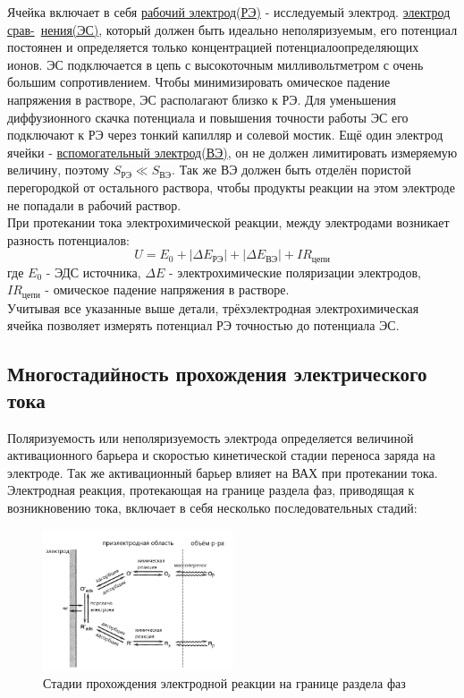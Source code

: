 \documentclass[a4paper,12pt]{article}
\begin{document}
Ячейка включает в себя \underline{рабочий электрод(РЭ)} - исследуемый электрод. \underline{электрод срав-}\
\underline{нения(ЭС)}, который должен быть идеально неполяризуемым, его потенциал постоянен и определяется только концентрацией потенциалоопределяющих ионов. ЭС подключается в цепь с высокоточным милливольтметром с очень большим сопротивлением. Чтобы минимизировать омическое падение напряжения в растворе, ЭС располагают близко к РЭ. Для уменьшения диффузионного скачка потенциала и повышения точности работы ЭС его подключают к РЭ через тонкий капилляр и солевой мостик. Ещё один электрод ячейки - \underline{вспомогательный электрод(ВЭ)}, он не должен лимитировать измеряемую величину, поэтому $S_{\text{РЭ}} \ll S_{\text{ВЭ}}$. Так же ВЭ должен быть отделён пористой перегородкой от остального раствора, чтобы продукты реакции на этом электроде не попадали в рабочий раствор.\\
При протекании тока электрохимической реакции, между электродами возникает разность потенциалов:
\[ U = E_0 + |\Delta{E_{\text{РЭ}}}| + |\Delta{E_{\text{ВЭ}}}| + IR_{\text{цепи}} \]
где $E_0$ - ЭДС источника, $\Delta{E}$ - электрохимические поляризации электродов, $IR_{\text{цепи}}$ - омическое падение напряжения в растворе.\\
Учитывая все указанные выше детали, трёхэлектродная электрохимическая ячейка позволяет измерять потенциал РЭ точностью до потенциала ЭС.\\
\subsection{Многостадийность прохождения электрического тока}
    
Поляризуемость или неполяризуемость электрода определяется величиной активационного барьера и скоростью кинетической стадии переноса заряда на электроде. Так же активационный барьер влияет на ВАХ при протекании тока. Электродная реакция, протекающая на границе раздела фаз, приводящая к возникновению тока, включает в себя несколько последовательных стадий:

\begin{figure}[h!]
    \centering
    \includegraphics[width = 0.5\textwidth]{стадии_тока.png}
    \caption{Стадии прохождения электродной реакции на границе раздела фаз}
    \label{fig:no_int}
\end{figure}\\
\end{document}
